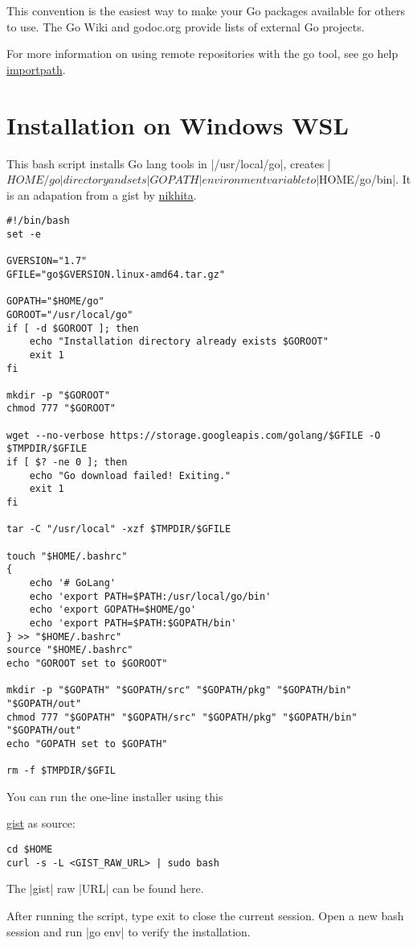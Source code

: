This convention is the easiest way to make your Go packages available for others to use. The Go Wiki and godoc.org provide lists of external Go projects.

For more information on using remote repositories with the go tool, see go help \href{https://golang.org/cmd/go/\#hdr-Remote_import_paths}{importpath}.


\section{Installation on Windows WSL}







This bash script installs Go lang tools in |/usr/local/go|, creates |$HOME/go| directory and sets |GOPATH| environment variable to |$HOME/go/bin|. It is an adapation from a gist by \href{https://gist.github.com/nikhita/432436d570b89cab172dcf2894465753}{nikhita}.

\begin{verbatim}
#!/bin/bash
set -e

GVERSION="1.7"
GFILE="go$GVERSION.linux-amd64.tar.gz"

GOPATH="$HOME/go"
GOROOT="/usr/local/go"
if [ -d $GOROOT ]; then
    echo "Installation directory already exists $GOROOT"
    exit 1
fi

mkdir -p "$GOROOT"
chmod 777 "$GOROOT"

wget --no-verbose https://storage.googleapis.com/golang/$GFILE -O $TMPDIR/$GFILE
if [ $? -ne 0 ]; then
    echo "Go download failed! Exiting."
    exit 1
fi

tar -C "/usr/local" -xzf $TMPDIR/$GFILE

touch "$HOME/.bashrc"
{
    echo '# GoLang'
    echo 'export PATH=$PATH:/usr/local/go/bin'
    echo 'export GOPATH=$HOME/go'
    echo 'export PATH=$PATH:$GOPATH/bin'
} >> "$HOME/.bashrc"
source "$HOME/.bashrc"
echo "GOROOT set to $GOROOT"

mkdir -p "$GOPATH" "$GOPATH/src" "$GOPATH/pkg" "$GOPATH/bin" "$GOPATH/out"
chmod 777 "$GOPATH" "$GOPATH/src" "$GOPATH/pkg" "$GOPATH/bin" "$GOPATH/out"
echo "GOPATH set to $GOPATH"

rm -f $TMPDIR/$GFIL
\end{verbatim}


You can run the one-line installer using this 

\href{https://github.com/udhos/update-golang/blob/master/update-golang.sh}{gist} as source:

\begin{verbatim}
cd $HOME
curl -s -L <GIST_RAW_URL> | sudo bash
\end{verbatim}

The |gist| raw |URL| can be found here.

After running the script, type exit to close the current session. Open a new bash session and run |go env| to verify the installation.




